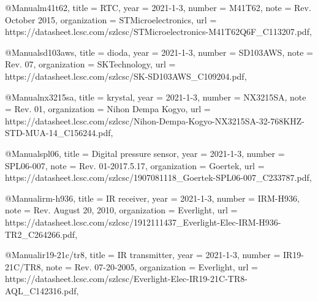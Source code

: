 @Manual{m41t62,
    title        = {RTC},
    year         = {2021-1-3},
    number       = {M41T62},
    note         = {Rev. October 2015},
    organization = {STMicroelectronics},
    url          = {https://datasheet.lcsc.com/szlcsc/STMicroelectronics-M41T62Q6F_C113207.pdf},
}

@Manual{sd103aws,
    title        = {dioda},
    year         = {2021-1-3},
    number       = {SD103AWS},
    note         = {Rev. 07},
    organization = {SKTechnology},
    url          = {https://datasheet.lcsc.com/szlcsc/SK-SD103AWS_C109204.pdf},
}

@Manual{nx3215sa,
    title        = {krystal},
    year         = {2021-1-3},
    number       = {NX3215SA},
    note         = {Rev. 01}, %
    organization = {Nihon Dempa Kogyo},
    url          = {https://datasheet.lcsc.com/szlcsc/Nihon-Dempa-Kogyo-NX3215SA-32-768KHZ-STD-MUA-14_C156244.pdf},
}

@Manual{spl06,
    title        = {Digital pressure sensor},
    year         = {2021-1-3},
    number       = {SPL06-007},
    note         = {Rev. 01-2017.5.17},
    organization = {Goertek},
    url          = {https://datasheet.lcsc.com/szlcsc/1907081118_Goertek-SPL06-007_C233787.pdf},
}

@Manual{irm-h936,
    title        = {IR receiver},
    year         = {2021-1-3},
    number       = {IRM-H936},
    note         = {Rev. August 20, 2010},
    organization = {Everlight},
    url          = {https://datasheet.lcsc.com/szlcsc/1912111437_Everlight-Elec-IRM-H936-TR2_C264266.pdf},
}

@Manual{ir19-21c/tr8,
    title        = {IR transmitter},
    year         = {2021-1-3},
    number       = {IR19-21C/TR8},
    note         = {Rev. 07-20-2005},
    organization = {Everlight},
    url          = {https://datasheet.lcsc.com/szlcsc/Everlight-Elec-IR19-21C-TR8-AQL_C142316.pdf},
}

